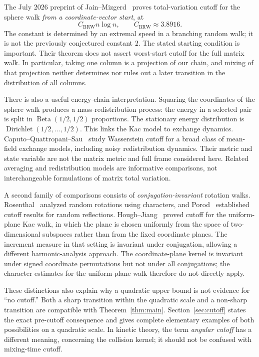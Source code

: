 \documentclass[11pt]{article}
\theoremstyle{definition}\newtheorem{definition}[theorem]{Definition}
\theoremstyle{remark}\newtheorem{remark}[theorem]{Remark}
\begin{document}
The July 2026 preprint of Jain--Mizgerd~\cite{JM26} proves total-variation cutoff for the sphere walk \emph{from a coordinate-vector start}, at
\[
 C_{\mathrm{BRW}}n\log n,\qquad C_{\mathrm{BRW}}\approx3.8916.
\]
The constant is determined by an extremal speed in a branching random walk; it is not the previously conjectured constant $2$. The stated starting condition is important. Their theorem does not assert worst-start cutoff for the full matrix walk. In particular, taking one column is a projection of our chain, and mixing of that projection neither determines nor rules out a later transition in the distribution of all columns.

There is also a useful energy-chain interpretation. Squaring the coordinates of the sphere walk produces a mass-redistribution process: the energy in a selected pair is split in $\operatorname{Beta}(1/2,1/2)$ proportions. The stationary energy distribution is $\operatorname{Dirichlet}(1/2,\ldots,1/2)$. This links the Kac model to exchange dynamics. Caputo--Quattropani--Sau~\cite{CQS25} study Wasserstein cutoff for a broad class of mean-field exchange models, including noisy redistribution dynamics. Their metric and state variable are not the matrix metric and full frame considered here. Related averaging and redistribution models are informative comparisons, not interchangeable formulations of matrix total variation.

A second family of comparisons consists of \emph{conjugation-invariant} rotation walks. Rosenthal~\cite{Rosenthal94} analyzed random rotations using characters, and Porod~\cite{Porod96} established cutoff results for random reflections. Hough--Jiang~\cite{HJ17} proved cutoff for the uniform-plane Kac walk, in which the plane is chosen uniformly from the space of two-dimensional subspaces rather than from the fixed coordinate planes. The increment measure in that setting is invariant under conjugation, allowing a different harmonic-analysis approach. The coordinate-plane kernel is invariant under signed coordinate permutations but not under all conjugations; the character estimates for the uniform-plane walk therefore do not directly apply.

These distinctions also explain why a quadratic upper bound is not evidence for ``no cutoff.'' Both a sharp transition within the quadratic scale and a non-sharp transition are compatible with Theorem~\ref{thm:main}. Section~\ref{sec:cutoff} states the exact pre-cutoff consequence and gives complete elementary examples of both possibilities on a quadratic scale. In kinetic theory, the term \emph{angular cutoff} has a different meaning, concerning the collision kernel; it should not be confused with mixing-time cutoff.
\end{document}
